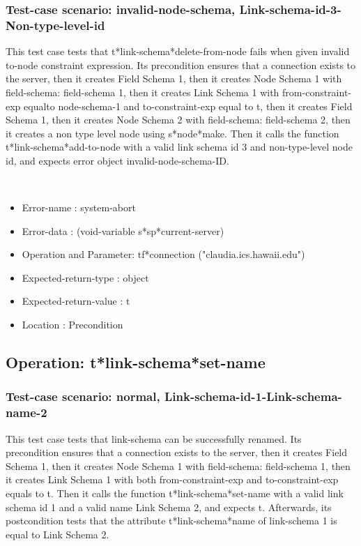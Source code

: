 \subsubsection {Test-case scenario: invalid-node-schema, Link-schema-id-3-Non-type-level-id}


This test case tests that t*link-schema*delete-from-node fails when given invalid to-node constraint expression.
Its precondition ensures that a connection exists to the server, then it creates Field Schema 1, then it creates Node Schema 1 with field-schema: field-schema 1, then it creates Link Schema 1 with from-constraint-exp equalto node-schema-1 and to-constraint-exp equal to t, then it creates Field Schema 1, then it creates Node Schema 2 with field-schema: field-schema 2, then it creates a non type level node using s*node*make.
Then it calls the function t*link-schema*add-to-node  with a valid link schema id 3 and non-type-level node id, and expects error object invalid-node-schema-ID.



\
\begin {itemize}
\item 	Error-name             : system-abort
\item Error-data             : (void-variable s*sp*current-server)
\item Operation and Parameter: tf*connection ("claudia.ics.hawaii.edu")
\item Expected-return-type   : object
\item Expected-return-value  : t
\item Location               : Precondition



\end {itemize}
\subsection {Operation: t*link-schema*set-name}
\subsubsection {Test-case scenario: normal, Link-schema-id-1-Link-schema-name-2}


This test case tests that link-schema can be successfully renamed.
Its precondition ensures that a connection exists to the server, then it creates Field Schema 1, then it creates Node Schema 1 with field-schema: field-schema 1, then it creates Link Schema 1 with both from-constraint-exp and to-constraint-exp equals to t.
Then it calls the function t*link-schema*set-name  with a valid link schema id 1 and a valid name Link Schema 2, and expects t.
Afterwards, its postcondition tests that the attribute t*link-schema*name of link-schema 1 is equal to Link Schema 2.


